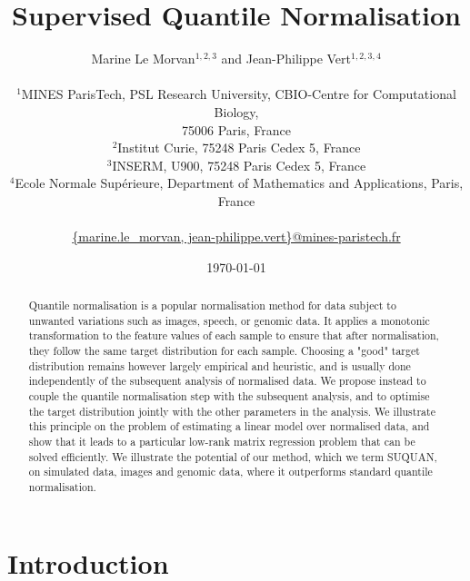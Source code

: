 \documentclass{article}
\date{\today}
\begin{document}
\title{Supervised Quantile Normalisation}
\author{Marine Le Morvan$^{1,2,3}$ and Jean-Philippe Vert$^{1,2,3,4}$\\ \\
$^1$MINES ParisTech, PSL Research University, CBIO-Centre for Computational Biology,\\
75006 Paris, France\\
$^2$Institut Curie, 75248 Paris Cedex 5, France\\
$^3$INSERM, U900, 75248 Paris Cedex 5, France\\
$^4$Ecole Normale Sup\'erieure, Department of Mathematics and Applications, Paris, France\\ \\
\url{{marine.le_morvan, jean-philippe.vert}@mines-paristech.fr}
}

\maketitle

\begin{abstract}
Quantile normalisation is a popular normalisation method for data subject to unwanted variations such as images, speech, or genomic data. It applies a monotonic transformation to the feature values of each sample to ensure that after normalisation, they follow the same target distribution for each sample. Choosing a "good" target distribution remains however largely empirical and heuristic, and is usually done independently of the subsequent analysis of normalised data. We propose instead to couple the quantile normalisation step with the subsequent analysis, and to optimise the target distribution jointly with the other parameters in the analysis. We illustrate this principle on the problem of estimating a linear model over normalised data, and show that it leads to a particular low-rank matrix regression problem that can be solved efficiently. We illustrate the potential of our method, which we term SUQUAN, on simulated data, images and genomic data, where it outperforms standard quantile normalisation.
\end{abstract}

\section{Introduction}
\end{document}
